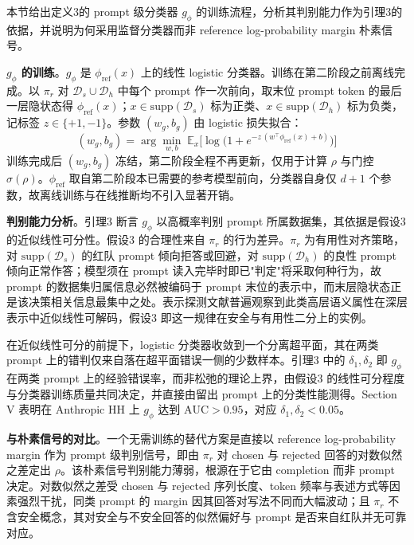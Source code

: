 \documentclass[lettersize,journal]{IEEEtran}
\begin{document}
本节给出定义3的 prompt 级分类器 $g_\phi$ 的训练流程，分析其判别能力作为引理3的依据，并说明为何采用监督分类器而非 reference log-probability margin 朴素信号。

\textbf{$g_\phi$ 的训练}。$g_\phi$ 是 $\phi_{\text{ref}}(x)$ 上的线性 logistic 分类器。训练在第二阶段之前离线完成。以 $\pi_r$ 对 $\mathcal{D}_s \cup \mathcal{D}_h$ 中每个 prompt 作一次前向，取末位 prompt token 的最后一层隐状态得 $\phi_{\text{ref}}(x)$；$x \in \mathrm{supp}(\mathcal{D}_s)$ 标为正类、$x \in \mathrm{supp}(\mathcal{D}_h)$ 标为负类，记标签 $z \in \{+1, -1\}$。参数 $(w_g, b_g)$ 由 logistic 损失拟合：
\begin{equation}
(w_g, b_g) = \arg\min_{w, b}\;
\mathbb{E}_{x}\big[\log\bigl(1 + e^{-z\,(w^\top \phi_{\text{ref}}(x) + b)}\bigr)\big]
\end{equation}
训练完成后 $(w_g, b_g)$ 冻结，第二阶段全程不再更新，仅用于计算 $\rho$ 与门控 $\sigma(\rho)$。$\phi_{\text{ref}}$ 取自第二阶段本已需要的参考模型前向，分类器自身仅 $d+1$ 个参数，故离线训练与在线推断均不引入显著开销。

\textbf{判别能力分析}。引理3 断言 $g_\phi$ 以高概率判别 prompt 所属数据集，其依据是假设3 的近似线性可分性。假设3 的合理性来自 $\pi_r$ 的行为差异。$\pi_r$ 为有用性对齐策略，对 $\mathrm{supp}(\mathcal{D}_s)$ 的红队 prompt 倾向拒答或回避，对 $\mathrm{supp}(\mathcal{D}_h)$ 的良性 prompt 倾向正常作答；模型须在 prompt 读入完毕时即已"判定"将采取何种行为，故 prompt 的数据集归属信息必然被编码于 prompt 末位的表示中，而末层隐状态正是该决策相关信息最集中之处。表示探测文献普遍观察到此类高层语义属性在深层表示中近似线性可解码\cite{alain2017understanding}，假设3 即这一规律在安全与有用性二分上的实例。

在近似线性可分的前提下，logistic 分类器收敛到一个分离超平面，其在两类 prompt 上的错判仅来自落在超平面错误一侧的少数样本。引理3 中的 $\delta_1, \delta_2$ 即 $g_\phi$ 在两类 prompt 上的经验错误率，而非松弛的理论上界，由假设3 的线性可分程度与分类器训练质量共同决定，并直接由留出 prompt 上的分类性能测得。Section V 表明在 Anthropic HH 上 $g_\phi$ 达到 $\text{AUC} > 0.95$，对应 $\delta_1, \delta_2 < 0.05$。

\textbf{与朴素信号的对比}。一个无需训练的替代方案是直接以 reference log-probability margin 作为 prompt 级判别信号，即由 $\pi_r$ 对 chosen 与 rejected 回答的对数似然之差定出 $\rho$。该朴素信号判别能力薄弱，根源在于它由 completion 而非 prompt 决定。对数似然之差受 chosen 与 rejected 序列长度、token 频率与表述方式等因素强烈干扰，同类 prompt 的 margin 因其回答对写法不同而大幅波动；且 $\pi_r$ 不含安全概念，其对安全与不安全回答的似然偏好与 prompt 是否来自红队并无可靠对应。
\end{document}
